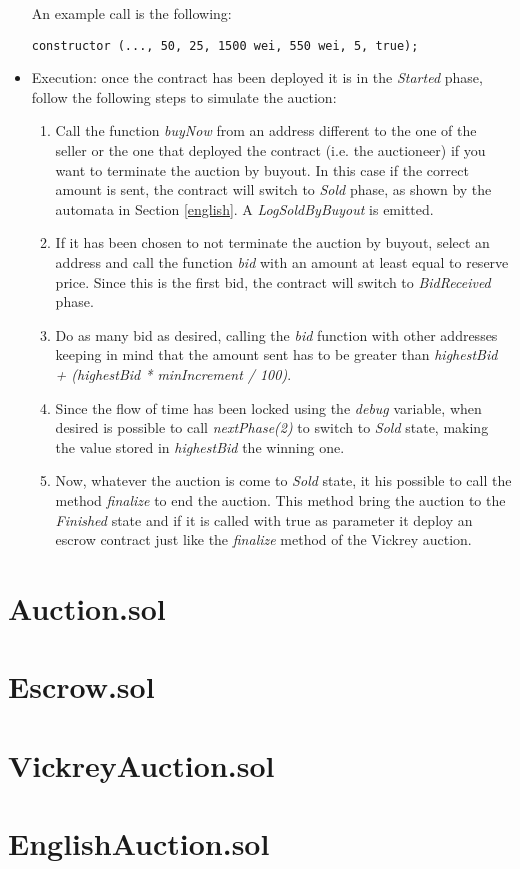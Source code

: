 \documentclass{article}
\begin{document}
\begin{itemize}
        An example call is the following:
        \begin{lstlisting}[language=Solidity]
constructor (..., 50, 25, 1500 wei, 550 wei, 5, true);
        \end{lstlisting}
    \item Execution: once the contract has been deployed it is in the \textit{Started} phase, follow the following steps to simulate the auction:
    \begin{enumerate}
        \item Call the function \textit{buyNow} from an address different to the one of the seller or the one that deployed the contract (i.e. the auctioneer) if you want to terminate the auction by buyout. In this case if the correct amount is sent, the contract will switch to \textit{Sold} phase, as shown by the automata in Section \ref{english}. A \textit{LogSoldByBuyout} is emitted.
        \item If it has been chosen to not terminate the auction by buyout, select an address and call the function \textit{bid} with an amount at least equal to reserve price. Since this is the first bid, the contract will switch to \textit{BidReceived} phase.
        \item Do as many bid as desired, calling the \textit{bid} function with other addresses keeping in mind that the amount sent has to be greater than \textit{highestBid + (highestBid * minIncrement / 100)}.
        \item Since the flow of time has been locked using the \textit{debug} variable, when desired is possible to call \textit{nextPhase(2)} to switch to \textit{Sold} state, making the value stored in \textit{highestBid} the winning one.
        \item Now, whatever the auction is come to \textit{Sold} state, it his possible to call the method \textit{finalize} to end the auction. This method bring the auction to the \textit{Finished} state and if it is called with true as parameter it deploy an escrow contract just like the \textit{finalize} method of the Vickrey auction.
    \end{enumerate}
\end{itemize}

\appendix

\section{Auction.sol}

\section{Escrow.sol}

\section{VickreyAuction.sol}

\section{EnglishAuction.sol}
\end{document}
